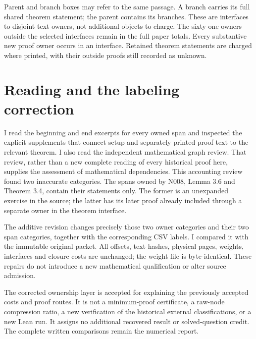 \documentclass[11pt,a4paper]{article}
\begin{document}
Parent and branch boxes may refer to the same passage. A branch carries its
full shared theorem statement; the parent contains its branches. These are
interfaces to disjoint text owners, not additional objects to charge. The
sixty-one owners outside the selected interfaces remain in the full paper
totals. Every substantive new proof owner occurs in an interface. Retained
theorem statements are charged where printed, with their outside proofs
still recorded as unknown.

\section{Reading and the labeling correction}
I read the beginning and end excerpts for every owned span and inspected
the explicit supplements that connect setup and separately printed proof
text to the relevant theorem. I also read the independent mathematical
graph review. That review, rather than a new complete reading of every
historical proof here, supplies the assessment of mathematical dependencies.
This accounting review found two inaccurate categories. The spans owned
by N008, Lemma 3.6 and Theorem 3.4, contain their statements only. The former
is an unexpanded exercise in the source; the latter has its later proof
already included through a separate owner in the theorem interface.

The additive revision changes precisely those two owner categories and
their two span categories, together with the corresponding CSV labels.
I compared it with the immutable original packet. All offsets, text hashes,
physical pages, weights, interfaces and closure costs are unchanged; the
weight file is byte-identical. These repairs do not introduce a new
mathematical qualification or alter source admission.

The corrected ownership layer is accepted for explaining the previously
accepted costs and proof routes. It is not a minimum-proof certificate, a
raw-node compression ratio, a new verification of the historical external
classifications, or a new Lean run. It assigns no additional recovered
result or solved-question credit. The complete written comparisons remain
the numerical report.
\end{document}
